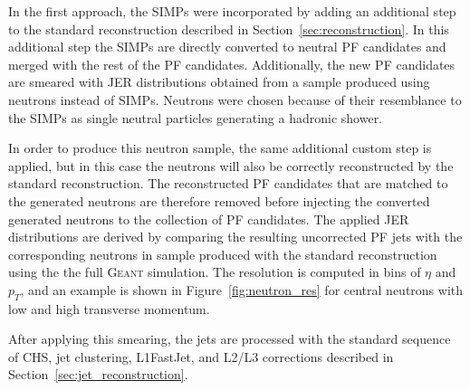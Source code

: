In the first approach, the \acp{SIMP} were incorporated by adding an additional step to the standard reconstruction described in Section~\ref{sec:reconstruction}. In this additional step the \acp{SIMP} are directly converted to neutral \ac{PF} candidates and merged with the rest of the \ac{PF} candidates. Additionally, the new \ac{PF} candidates are smeared with \ac{JER} distributions obtained from a sample produced using neutrons instead of \acp{SIMP}. Neutrons were chosen because of their resemblance to the \acp{SIMP} as single neutral particles generating a hadronic shower. 

In order to produce this neutron sample, the same additional custom step is applied, but in this case the neutrons will also be correctly reconstructed by the standard reconstruction. The reconstructed \ac{PF} candidates that are matched to the generated neutrons are therefore removed before injecting the converted generated neutrons to the collection of \ac{PF} candidates. The applied \ac{JER} distributions are derived by comparing the resulting uncorrected \ac{PF} jets with the corresponding neutrons in sample produced with the standard reconstruction using the the full \textsc{Geant} simulation. The resolution is computed in bins of $\eta$ and $p_T$, and an example is shown in Figure~\ref{fig:neutron_res} for central neutrons with low and high transverse momentum. 

After applying this smearing, the jets are processed with the standard sequence of \ac{CHS}, jet clustering, L1FastJet, and L2/L3 corrections described in Section~\ref{sec:jet_reconstruction}.



